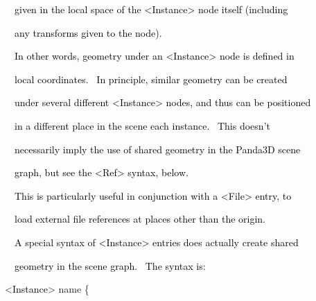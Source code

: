\documentclass[a4paper]{article}
\newcommand\textstyleOOoComputerKeyWord[1]{\textrm{\textcolor[rgb]{0.0,0.0,0.5019608}{#1}}}
\newcommand\textstyleOOoAssemblerSpecialChar[1]{\textrm{\textcolor[rgb]{0.0,0.5019608,0.0}{#1}}}
\newcommand\textstyleOOoAssemblerIdent[1]{\textrm{\textcolor{black}{#1}}}
\newcommand\textstyleOOoAssemblerDirective[1]{\textrm{\textcolor[rgb]{0.0,0.5019608,1.0}{#1}}}
\begin{document}
{\color{black}
\textstyleOOoComputerKeyWord{\textcolor{black}{\ \ given in the local space of the {\textless}Instance{\textgreater}
node itself (including}}}

{\color{black}
\textstyleOOoComputerKeyWord{\textcolor{black}{\ \ any transforms given to the node).}}}


\bigskip

{\color{black}
\textstyleOOoComputerKeyWord{\textcolor{black}{\ \ In other words, geometry under an {\textless}Instance{\textgreater}
node is defined in}}}

{\color{black}
\textstyleOOoComputerKeyWord{\textcolor{black}{\ \ local coordinates. \ In principle, similar geometry can be created}}}

\clearpage
\bigskip

{\color{black}
\textstyleOOoComputerKeyWord{\textcolor{black}{\ \ under several different {\textless}Instance{\textgreater} nodes, and
thus can be positioned}}}

{\color{black}
\textstyleOOoComputerKeyWord{\textcolor{black}{\ \ in a different place in the scene each instance. \ This doesn't}}}

{\color{black}
\textstyleOOoComputerKeyWord{\textcolor{black}{\ \ necessarily imply the use of shared geometry in the Panda3D scene}}}

{\color{black}
\textstyleOOoComputerKeyWord{\textcolor{black}{\ \ graph, but see the {\textless}Ref{\textgreater} syntax, below.}}}


\bigskip

{\color{black}
\textstyleOOoComputerKeyWord{\textcolor{black}{\ \ This is particularly useful in conjunction with a
{\textless}File{\textgreater} entry, to}}}

{\color{black}
\textstyleOOoComputerKeyWord{\textcolor{black}{\ \ load external file references at places other than the origin.}}}


\bigskip


\bigskip

{\color{black}
\textstyleOOoComputerKeyWord{\textcolor{black}{\ \ A special syntax of {\textless}Instance{\textgreater} entries does
actually create shared}}}

{\color{black}
\textstyleOOoComputerKeyWord{\textcolor{black}{\ \ geometry in the scene graph. \ The syntax is:}}}


\bigskip

{\color{black}
\textstyleOOoAssemblerSpecialChar{{\textless}}\textstyleOOoAssemblerIdent{Instance}\textstyleOOoAssemblerSpecialChar{{\textgreater}}\textstyleOOoComputerKeyWord{\textcolor{black}{
}}\textstyleOOoAssemblerDirective{name}\textstyleOOoComputerKeyWord{\textcolor{black}{
}}\textstyleOOoAssemblerSpecialChar{\{}}
\end{document}
